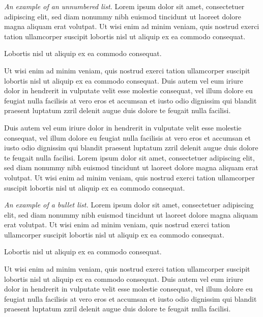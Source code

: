 \documentclass[oldfontcommands,6x9]{pupbook}
\begin{document}
\begin{unnumberlist}
\item \textit{An example of an unnumbered list.} Lorem ipsum
dolor sit amet, consectetuer adipiscing elit, sed diam nonummy nibh
euismod tincidunt ut laoreet dolore magna aliquam erat volutpat. Ut wisi
enim ad minim veniam, quis nostrud exerci tation ullamcorper suscipit
lobortis nisl ut aliquip ex ea commodo consequat. 

\item Lobortis nisl ut aliquip ex ea commodo consequat.

\item Ut wisi enim ad minim veniam, quis nostrud exerci tation
ullamcorper suscipit lobortis nisl ut aliquip ex ea commodo consequat.
Duis autem vel eum iriure dolor in hendrerit in vulputate velit esse
molestie consequat, vel illum dolore eu feugiat nulla facilisis at vero
eros et accumsan et iusto odio dignissim qui blandit praesent luptatum
zzril delenit augue duis dolore te feugait nulla facilisi.

\end{unnumberlist}

Duis autem vel eum iriure dolor in hendrerit in vulputate velit esse
molestie consequat, vel illum dolore eu feugiat nulla facilisis at vero
eros et accumsan et iusto odio dignissim qui blandit praesent luptatum
zzril delenit augue duis dolore te feugait nulla facilisi. Lorem ipsum
dolor sit amet, consectetuer adipiscing elit, sed diam nonummy nibh
euismod tincidunt ut laoreet dolore magna aliquam erat volutpat. Ut wisi
enim ad minim veniam, quis nostrud exerci tation ullamcorper suscipit
lobortis nisl ut aliquip ex ea commodo consequat. 

\begin{bulletlist}
\item \textit{An example of a bullet list.} Lorem ipsum
dolor sit amet, consectetuer adipiscing elit, sed diam nonummy nibh
euismod tincidunt ut laoreet dolore magna aliquam erat volutpat. Ut wisi
enim ad minim veniam, quis nostrud exerci tation ullamcorper suscipit
lobortis nisl ut aliquip ex ea commodo consequat. 

\item Lobortis nisl ut aliquip ex ea commodo consequat.

\item Ut wisi enim ad minim veniam, quis nostrud exerci tation
ullamcorper suscipit lobortis nisl ut aliquip ex ea commodo consequat.
Duis autem vel eum iriure dolor in hendrerit in vulputate velit esse
molestie consequat, vel illum dolore eu feugiat nulla facilisis at vero
eros et accumsan et iusto odio dignissim qui blandit praesent luptatum
zzril delenit augue duis dolore te feugait nulla facilisi.
\end{bulletlist}
\end{document}
